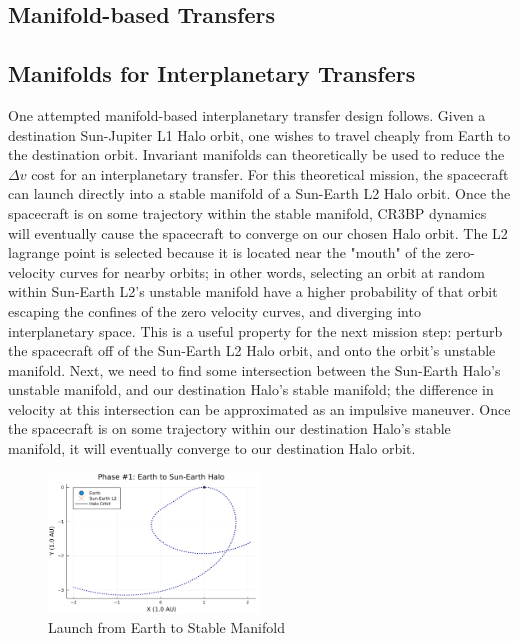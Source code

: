 \documentclass[conf]{new-aiaa}
\begin{document}
\begin{multicols*}{2}
\section{Manifold-based Transfers}

\subsection{Manifolds for Interplanetary Transfers}
One attempted manifold-based interplanetary transfer design follows.
Given a destination Sun-Jupiter L1 Halo orbit, one wishes to travel cheaply
from Earth to the destination orbit. Invariant manifolds can theoretically 
be used to reduce the $\Delta v$ cost for an interplanetary transfer.
For this theoretical mission, the spacecraft can launch directly 
into a stable manifold of a Sun-Earth L2 Halo orbit. Once the 
spacecraft is on some trajectory within the stable manifold, 
CR3BP dynamics will eventually cause the spacecraft to converge
on our chosen Halo orbit. The L2 lagrange point is selected because 
it is located near the "mouth"
of the zero-velocity curves for nearby orbits; in other words, 
selecting an orbit at random within Sun-Earth L2's unstable manifold 
have a higher probability of that orbit 
escaping the confines of the zero 
velocity curves, and diverging into interplanetary space. This is a useful 
property for the next mission step: perturb the spacecraft off of the Sun-Earth 
L2 Halo orbit, and onto the orbit's unstable manifold. Next, we need to find 
some intersection between the Sun-Earth Halo's unstable manifold, and 
our destination Halo's stable manifold; the difference in velocity at this 
intersection can be approximated as an impulsive maneuver. Once the spacecraft
is on some trajectory within our destination Halo's stable manifold,
it will eventually converge to our destination Halo orbit. 

\begin{figure}[H]
    \hskip -0.3cm
    \includegraphics[width=0.5\textwidth]{manifold_transfer_phase1.png}
    \caption{Launch from Earth to Stable Manifold}
\end{figure}


\end{multicols*}
\end{document}
